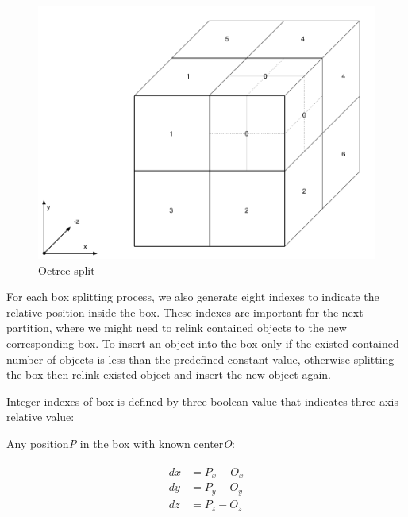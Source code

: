 \begin{figure}[H]
\caption{Octree split}
\label{fig:octree-split}
\centering
\includegraphics[width=\linewidth]{Figures/octree-split.png}
\decoRule
\end{figure}

For each box splitting process, we also generate eight indexes to indicate the relative position inside the box. These indexes are important for the next partition, where we might need to relink contained objects to the new corresponding box. To insert an object into
the box only if the existed contained number of objects is less than the predefined constant value, otherwise splitting the box then relink existed object and insert the new object again.

Integer indexes of box is defined by three boolean value that indicates three axis-relative value:

Any position\;\emph{P} in the box with known center\emph{O}:

\[
\begin{array}{lr}
\begin{aligned}
dx &= P_x - O_x\\
dy &= P_y - O_y\\
dz &= P_z - O_z\\
\end{aligned}
\end{array}
\]

